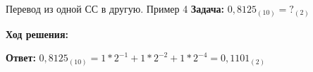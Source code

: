 \documentclass{beamer}
\begin{document}
\hspace*{\fill} \Large{\color{blue}П\color{black}еревод из одной СС в другую. Пример 4 }
    \textbf{Задача:} \begin{math} 0,8125_{(10)} = ?_{(2)}\end{math}
    
    \textbf{Ход решения:}
    \begin{center}
    \end{center}

    \textbf{Ответ:} \begin{math}
            0,8125_{(10)} = 1 * 2^{-1} + 1 * 2^{-2} + 1 * 2^{-4} = 0,1101_{(2)}
    \end{math}
\end{document}
